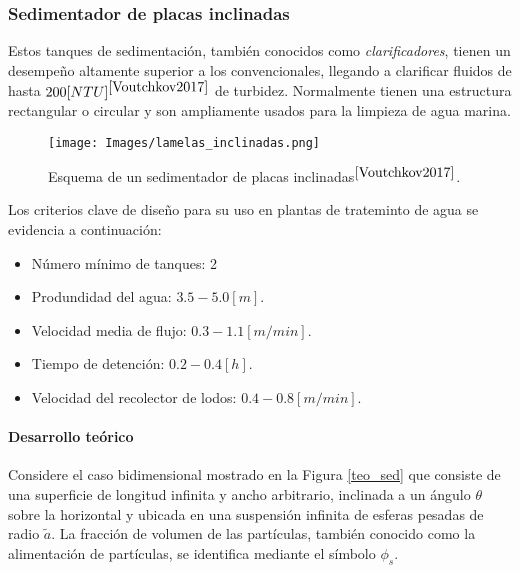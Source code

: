 \newpage

\subsubsection{Sedimentador de placas inclinadas}

\noindent
\justify

Estos tanques de sedimentaci\'on, tambi\'en conocidos como \textit{clarificadores}, tienen un desempe\~no altamente superior a los convencionales, llegando a clarificar fluidos de hasta $200 [NTU]^{\cite{Voutchkov2017}}$ de turbidez. Normalmente tienen una estructura rectangular o circular y son ampliamente usados para la limpieza de agua marina. 

\begin{figure}[h!]
	\centering
	\texttt{[image: Images/lamelas\_inclinadas.png]}
	\caption{Esquema de un sedimentador de placas inclinadas$^{\cite{Voutchkov2017}}$.}
	\label{lamelas_inclinadas}
\end{figure}


\noindent
\justify

Los criterios clave de dise\~no para su uso en plantas de trateminto de agua se evidencia a continuaci\'on:

\begin{itemize}
	\item N\'umero m\'inimo de tanques: 2
	\item Produndidad del agua: $3.5 - 5.0 [m]$.
	\item Velocidad media de flujo: $0.3 - 1.1 [m/min]$.
	\item Tiempo de detenci\'on: $0.2 - 0.4 [h]$.
	\item Velocidad del recolector de lodos: $0.4 - 0.8 [m/min]$.
\end{itemize}

\paragraph{Desarrollo te\'orico} \label{Acribos}

\noindent
\justify

Considere el caso bidimensional mostrado en la Figura \ref{teo_sed} que consiste de una superficie de longitud infinita y ancho arbitrario, inclinada a un \'angulo $\theta$ sobre la horizontal y ubicada en una suspensi\'on infinita de esferas pesadas de radio $\tilde{a}$. La fracci\'on de volumen de las part\'iculas, tambi\'en conocido como la alimentaci\'on de part\'iculas, se identifica mediante el s\'imbolo $\phi _s$.

